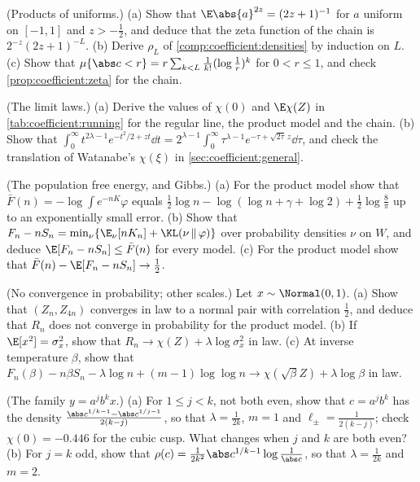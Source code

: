 \begin{refsection}
\begin{exercises}
\item \consolidation (Products of uniforms.) (a) Show that $\E\abs{a}^{2z}=(2z+1)^{-1}$ for $a$ uniform on $[-1,1]$ and $z>-\frac12$, and deduce that the zeta function of the chain is $2^{-z}(2z+1)^{-L}$. (b) Derive $\rho_L$ of \cref{comp:coefficient:densities} by induction on $L$. (c) Show that $\mu\{\abs c<r\}=r\sum_{k<L}\frac1{k!}(\log\frac1r)^k$ for $0<r\le1$, and check \cref{prop:coefficient:zeta} for the chain.\label{ex:coefficient:products}

\item \consolidation (The limit laws.) (a) Derive the values of $\chi(0)$ and $\E\chi(Z)$ in \cref{tab:coefficient:running} for the regular line, the product model and the chain. (b) Show that $\int_0^\infty t^{2\lambda-1}e^{-t^2/2+zt}\dd t=2^{\lambda-1}\int_0^\infty\tau^{\lambda-1}e^{-\tau+\sqrt{2\tau}\,z}\dd\tau$, and check the translation of Watanabe's $\chi(\xi)$ in \cref{sec:coefficient:general}.\label{ex:coefficient:limits}

\item \consolidation (The population free energy, and Gibbs.) (a) For the product model show that $\bar F(n)=-\log\int e^{-nK}\varphi$ equals $\frac12\log n-\log(\log n+\gamma+\log2)+\frac12\log\frac8\pi$ up to an exponentially small error.  (b) Show that $F_n-nS_n=\min_\nu\{\E_\nu[nK_n]+\KL(\nu\,\|\,\varphi)\}$ over probability densities $\nu$ on $W$, and deduce $\E[F_n-nS_n]\le\bar F(n)$ for every model. (c) For the product model show that $\bar F(n)-\E[F_n-nS_n]\to\frac12$.\label{ex:coefficient:population}

\item \consolidation (No convergence in probability; other scales.) Let $x\sim\Normal(0,1)$. (a) Show that $(Z_n,Z_{4n})$ converges in law to a normal pair with correlation $\frac12$, and deduce that $R_n$ does not converge in probability for the product model.  (b) If $\E[x^2]=\sigma_x^2$, show that $R_n\to\chi(Z)+\lambda\log\sigma_x^2$ in law. (c) At inverse temperature $\beta$, show that $F_n(\beta)-n\beta S_n-\lambda\log n+(m-1)\log\log n\to\chi(\sqrt\beta Z)+\lambda\log\beta$ in law.\label{ex:coefficient:notinprob}

\item \byhand (The family $y=a^jb^kx$.) (a) For $1\le j<k$, not both even, show that $c=a^jb^k$ has the density $\frac{\abs c^{1/k-1}-\abs c^{1/j-1}}{2(k-j)}$, so that $\lambda=\frac1{2k}$, $m=1$ and $\ell_\pm=\frac1{2(k-j)}$; check $\chi(0)=-0.446$ for the cubic cusp. What changes when $j$ and $k$ are both even? (b) For $j=k$ odd, show that $\rho(c)=\frac1{2k^2}\abs c^{1/k-1}\log\frac1{\abs c}$, so that $\lambda=\frac1{2k}$ and $m=2$.\label{ex:coefficient:family}


\end{exercises}
\end{refsection}
